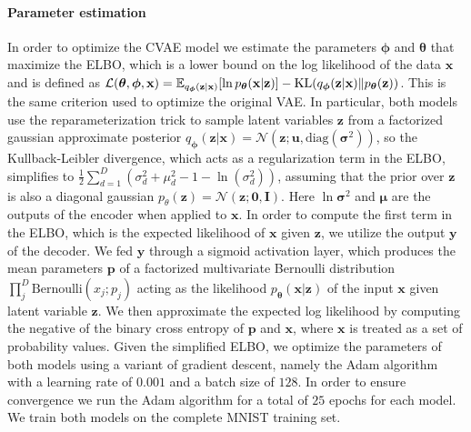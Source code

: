 \paragraph{Parameter estimation}
In order to optimize the CVAE model we estimate the parameters $\bm{\phi}$ and $\bm{\theta}$ that maximize the ELBO, which is a lower bound on the log likelihood of the data $\mathbf{x}$ and is defined as $\mathcal{L}(\bm{\theta}, \bm{\phi}, \mathbf{x}) = \E_{q_{\bm{\phi}}(\mathbf{z}|\mathbf{x})}{\lrs{\ln{p_{\bm{\theta}}(\mathbf{x} |\mathbf{z} )}}} - \KL (q_{\bm{\phi}}(\mathbf{z}|\mathbf{x}) \lVert p_{\bm{\theta}}(\mathbf{z}) )$. This is the same criterion used to optimize the original VAE\@. In particular, both models use the reparameterization trick to sample latent variables $\mathbf{z}$ from a factorized gaussian approximate posterior $q_{\bm{\phi}}(\mathbf{z}|\mathbf{x}) = \mathcal{N}(\mathbf{z}; \mathbf{u}, \text{diag}(\bm{\sigma}^2))$, so the Kullback-Leibler divergence, which acts as a regularization term in the ELBO, simplifies to $\frac{1}{2}\sum_{d=1}^{D}(\sigma_d^2 + \mu_d^2 - 1 - \ln(\sigma_d^2))$, assuming that the prior over $\mathbf{z}$ is also a diagonal gaussian $p_{\theta}(\mathbf{z}) = \mathcal{N}(\mathbf{z};\mathbf{0}, \mathbf{I})$. Here $\ln{\bm{\sigma}^2}$ and $\bm{\mu}$ are the outputs of the encoder when applied to $\mathbf{x}$. In order to compute the first term in the ELBO, which is the expected likelihood of $\mathbf{x}$ given $\mathbf{z}$, we utilize the output $\mathbf{y}$ of the decoder. We fed $\mathbf{y}$ through a sigmoid activation layer, which produces the mean parameters $\mathbf{p}$ of a factorized multivariate Bernoulli distribution $\prod_j^{D} \text{Bernoulli}(x_j; p_j)$ acting as the likelihood $p_{\bm{\theta}}(\mathbf{x} |\mathbf{z} )$ of the input $\mathbf{x}$ given latent variable $\mathbf{z}$. We then approximate  the expected log likelihood by computing the negative of the binary cross entropy of $\mathbf{p}$ and $\mathbf{x}$, where $\mathbf{x}$ is treated as a set of probability values. Given the simplified ELBO, we optimize the parameters of both models using a variant of gradient descent, namely the Adam algorithm with a learning rate of $0.001$ and a batch size of $128$. In order to ensure convergence we run the Adam algorithm for a total of $25$ epochs for each model. We train both models on the complete MNIST training set.

